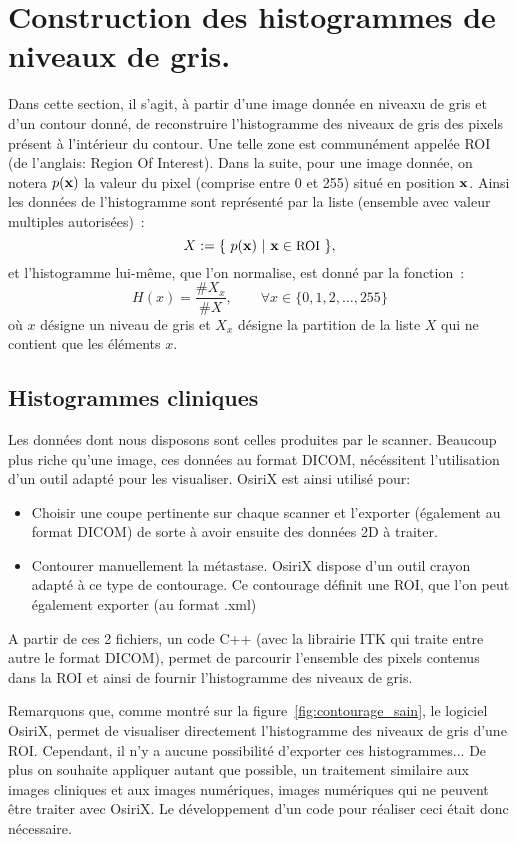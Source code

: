 \documentclass[main.tex]{subfiles}
\begin{document}
\section{Construction des histogrammes de niveaux de gris.}
Dans cette section, il s'agit, à partir d'une image donnée en niveaxu de gris et d'un contour donné, de reconstruire l'histogramme des niveaux de gris des pixels présent à l'intérieur du contour. Une telle zone est communément appelée ROI (de l'anglais: Region Of Interest). Dans la suite, pour une image donnée, on notera $p(\mathbf{x})$ la valeur du pixel (comprise entre 0 et 255) situé en position $\mathbf{x}$. Ainsi les données de l'histogramme sont représenté par la liste (ensemble avec valeur multiples autorisées)~:
\begin{equation}
\label{eq:def_data_histo}
X:=\{ \ p(\mathbf{x}) \  | \  \mathbf{x} \in \textrm{\small ROI} \ \},
\end{equation}
et l'histogramme lui-même, que l'on normalise, est donné par la fonction~:
\begin{equation}
\label{eq:def_histo}
H(x) = \dfrac{ \# X_x  }{ \# X }, \qquad \forall x \in \{ 0,1,2,\ldots,255 \}
\end{equation}
où $x$ désigne un niveau de gris et $X_x$ désigne la partition de la liste $X$ qui ne contient que les éléments $x$.

\subsection{Histogrammes cliniques}
Les données dont nous disposons sont celles produites par le scanner. Beaucoup plus riche qu'une image, ces données au format DICOM, nécéssitent l'utilisation d'un outil adapté pour les visualiser. OsiriX est ainsi utilisé pour:
\begin{itemize}
\item Choisir une coupe pertinente sur chaque scanner et l'exporter (également au format DICOM) de sorte à avoir ensuite des données 2D à traiter.
\item Contourer manuellement la métastase. OsiriX dispose d'un outil crayon adapté à ce type de contourage. Ce contourage définit une ROI, que l'on peut également exporter (au format .xml)
\end{itemize}
A partir de ces 2 fichiers, un code C++ (avec la librairie ITK qui traite entre autre le format DICOM), permet de parcourir l'ensemble des pixels contenus dans la ROI et ainsi de fournir l'histogramme des niveaux de gris.

Remarquons que, comme montré sur la figure~\ref{fig:contourage_sain}, le logiciel OsiriX, permet de visualiser directement l'histogramme des niveaux de gris d'une ROI. Cependant, il n'y a aucune possibilité d'exporter ces histogrammes... De plus on souhaite appliquer autant que possible, un traitement similaire aux images cliniques et aux images numériques, images numériques qui ne peuvent être traiter avec OsiriX. Le développement d'un code pour réaliser ceci était donc nécessaire.
\end{document}
